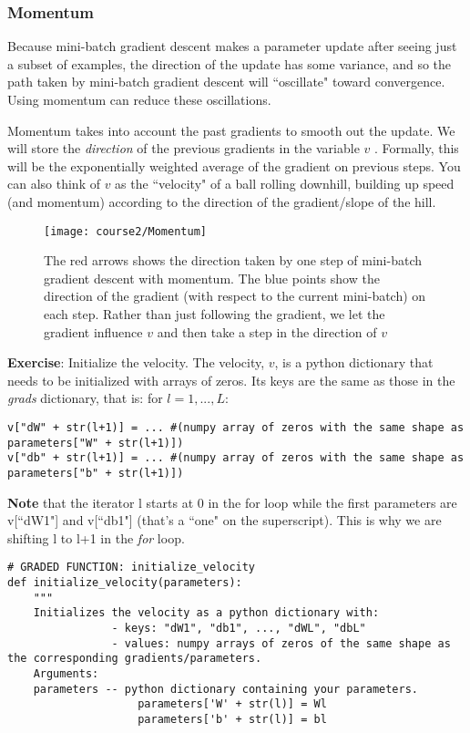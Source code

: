 {\subsubsection{Momentum}

Because mini-batch gradient descent makes a parameter update after seeing just a subset of examples, the direction of the update has some variance, and so the path taken by mini-batch gradient descent will ``oscillate" toward convergence. Using momentum can reduce these oscillations.


Momentum takes into account the past gradients to smooth out the update. We will store the \emph{direction} of the previous gradients in the variable  $v$ . Formally, this will be the exponentially weighted average of the gradient on previous steps. You can also think of  $v$  as the ``velocity" of a ball rolling downhill, building up speed (and momentum) according to the direction of the gradient/slope of the hill.
\begin{figure}[h]
\begin{center}
\texttt{[image: course2/Momentum]}
\end{center}
\caption{The {\color{red}red arrows} shows the direction taken by one step of mini-batch gradient descent with momentum. The {\color{blue}blue points} show the direction of the gradient (with respect to the current mini-batch) on each step. Rather than just following the gradient, we let the gradient influence  $v$ and then take a step in the direction of $v$}
\end{figure}


{\textbf{Exercise}}: Initialize the velocity. The velocity, $v$, is a python dictionary that needs to be initialized with arrays of zeros. Its keys are the same as those in the \emph{grads} dictionary, that is: for $l =1,...,L$:
\begin{verbatim}
v["dW" + str(l+1)] = ... #(numpy array of zeros with the same shape as parameters["W" + str(l+1)])
v["db" + str(l+1)] = ... #(numpy array of zeros with the same shape as parameters["b" + str(l+1)])
\end{verbatim}

{\textbf{Note}} that the iterator l starts at 0 in the for loop while the first parameters are v[``dW1"] and v[``db1"] (that's a ``one" on the superscript). This is why we are shifting l to l+1 in the \emph{for} loop.


\begin{verbatim}
# GRADED FUNCTION: initialize_velocity
def initialize_velocity(parameters):
    """
    Initializes the velocity as a python dictionary with:
                - keys: "dW1", "db1", ..., "dWL", "dbL" 
                - values: numpy arrays of zeros of the same shape as the corresponding gradients/parameters.
    Arguments:
    parameters -- python dictionary containing your parameters.
                    parameters['W' + str(l)] = Wl
                    parameters['b' + str(l)] = bl
    

\end{verbatim}}
